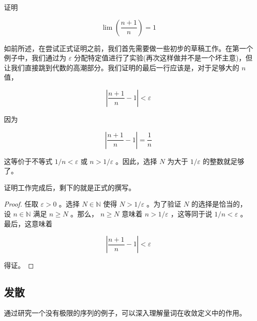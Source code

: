 \begin{Eg}
  \label{eg:2.2.6}
证明

\[
\lim \left( \frac{n + 1}{n}\right)  = 1
\]

如前所述，在尝试正式证明之前，我们首先需要做一些初步的草稿工作。在第一个例子中，我们通过为 \(\varepsilon\) 分配特定值进行了实验(再次这样做并不是一个坏主意)，但让我们直接跳到代数的高潮部分。我们证明的最后一行应该是，对于足够大的 \(n\) 值，

\[
\left| {\frac{n + 1}{n} - 1}\right|  < \varepsilon
\]

因为

\[
\left| {\frac{n + 1}{n} - 1}\right|  = \frac{1}{n}
\]

这等价于不等式 \(1/n < \varepsilon\) 或 \(n > 1/\varepsilon\) 。因此，选择 \(N\) 为大于 \(1/\varepsilon\) 的整数就足够了。

证明工作完成后，剩下的就是正式的撰写。

\begin{proof}
  任取 \(\varepsilon  > 0\) 。选择 \(N \in  \mathbb{N}\) 使得 \(N > 1/\varepsilon\) 。为了验证 \(N\) 的选择是恰当的，设 \(n \in  \mathbb{N}\) 满足 \(n \geq  N\) 。那么， \(n \geq  N\) 意味着 \(n > 1/\varepsilon\) ，这等同于说 \(1/n < \varepsilon\) 。最后，这意味着

\[
\left| {\frac{n + 1}{n} - 1}\right|  < \varepsilon
\]

得证。
\end{proof}
\end{Eg}

\subsection{发散}

通过研究一个没有极限的序列的例子，可以深入理解量词在收敛定义中的作用。


